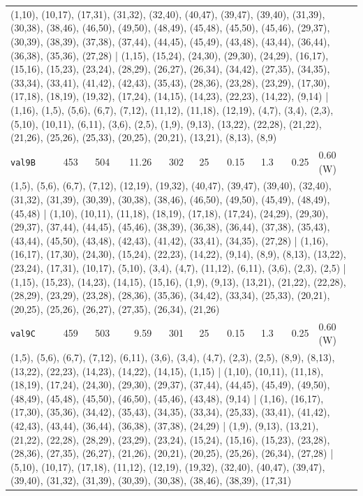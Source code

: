 \begin{longtable}{lrrrrrrrrl}
\multicolumn{10}{p{0.96\linewidth}}{\tiny\raggedright\arraybackslash (1,10), (10,17), (17,31), (31,32), (32,40), (40,47), (39,47), (39,40), (31,39), (30,38), (38,46), (46,50), (49,50), (48,49), (45,48), (45,50), (45,46), (29,37), (30,39), (38,39), (37,38), (37,44), (44,45), (45,49), (43,48), (43,44), (36,44), (36,38), (35,36), (27,28) | (1,15), (15,24), (24,30), (29,30), (24,29), (16,17), (15,16), (15,23), (23,24), (28,29), (26,27), (26,34), (34,42), (27,35), (34,35), (33,34), (33,41), (41,42), (42,43), (35,43), (28,36), (23,28), (23,29), (17,30), (17,18), (18,19), (19,32), (17,24), (14,15), (14,23), (22,23), (14,22), (9,14) | (1,16), (1,5), (5,6), (6,7), (7,12), (11,12), (11,18), (12,19), (4,7), (3,4), (2,3), (5,10), (10,11), (6,11), (3,6), (2,5), (1,9), (9,13), (13,22), (22,28), (21,22), (21,26), (25,26), (25,33), (20,25), (20,21), (13,21), (8,13), (8,9)} \\[2pt]
\texttt{val9B} & 453 & 504 & 11.26 & 302 & 25 & 0.15 & 1.3 & 0.25 & 0.60\,(W) \\
\multicolumn{10}{p{0.96\linewidth}}{\tiny\raggedright\arraybackslash (1,5), (5,6), (6,7), (7,12), (12,19), (19,32), (40,47), (39,47), (39,40), (32,40), (31,32), (31,39), (30,39), (30,38), (38,46), (46,50), (49,50), (45,49), (48,49), (45,48) | (1,10), (10,11), (11,18), (18,19), (17,18), (17,24), (24,29), (29,30), (29,37), (37,44), (44,45), (45,46), (38,39), (36,38), (36,44), (37,38), (35,43), (43,44), (45,50), (43,48), (42,43), (41,42), (33,41), (34,35), (27,28) | (1,16), (16,17), (17,30), (24,30), (15,24), (22,23), (14,22), (9,14), (8,9), (8,13), (13,22), (23,24), (17,31), (10,17), (5,10), (3,4), (4,7), (11,12), (6,11), (3,6), (2,3), (2,5) | (1,15), (15,23), (14,23), (14,15), (15,16), (1,9), (9,13), (13,21), (21,22), (22,28), (28,29), (23,29), (23,28), (28,36), (35,36), (34,42), (33,34), (25,33), (20,21), (20,25), (25,26), (26,27), (27,35), (26,34), (21,26)} \\[2pt]
\texttt{val9C} & 459 & 503 & 9.59 & 301 & 25 & 0.15 & 1.3 & 0.25 & 0.60\,(W) \\
\multicolumn{10}{p{0.96\linewidth}}{\tiny\raggedright\arraybackslash (1,5), (5,6), (6,7), (7,12), (6,11), (3,6), (3,4), (4,7), (2,3), (2,5), (8,9), (8,13), (13,22), (22,23), (14,23), (14,22), (14,15), (1,15) | (1,10), (10,11), (11,18), (18,19), (17,24), (24,30), (29,30), (29,37), (37,44), (44,45), (45,49), (49,50), (48,49), (45,48), (45,50), (46,50), (45,46), (43,48), (9,14) | (1,16), (16,17), (17,30), (35,36), (34,42), (35,43), (34,35), (33,34), (25,33), (33,41), (41,42), (42,43), (43,44), (36,44), (36,38), (37,38), (24,29) | (1,9), (9,13), (13,21), (21,22), (22,28), (28,29), (23,29), (23,24), (15,24), (15,16), (15,23), (23,28), (28,36), (27,35), (26,27), (21,26), (20,21), (20,25), (25,26), (26,34), (27,28) | (5,10), (10,17), (17,18), (11,12), (12,19), (19,32), (32,40), (40,47), (39,47), (39,40), (31,32), (31,39), (30,39), (30,38), (38,46), (38,39), (17,31)} \\[2pt]

\end{longtable}
